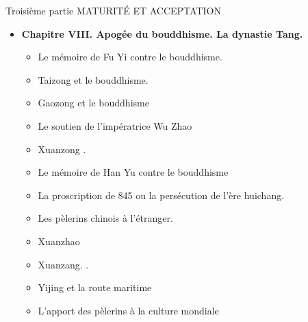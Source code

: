 Troisième partie
MATURITÉ ET ACCEPTATION
\begin{itemize}
    \item \textbf{Chapitre VIII. Apogée du bouddhisme. La dynastie Tang.}
    \begin{itemize}
        \item Le mémoire de Fu Yi contre le bouddhisme.
    \end{itemize}
    \begin{itemize}
        \item Taizong et le bouddhisme.
    \end{itemize}
    \begin{itemize}
        \item Gaozong et le bouddhisme
    \end{itemize}
    \begin{itemize}
        \item Le soutien de l'impératrice Wu Zhao
    \end{itemize}
    \begin{itemize}
        \item Xuanzong .
    \end{itemize}
    \begin{itemize}
        \item Le mémoire de Han Yu contre le bouddhisme
    \end{itemize}
    \begin{itemize}
        \item La proscription de 845 ou la persécution de l'ère huichang.
    \end{itemize}
    \begin{itemize}
        \item Les pèlerins chinois à l'étranger.
    \end{itemize}
    \begin{itemize}
        \item Xuanzhao
    \end{itemize}
    \begin{itemize}
        \item Xuanzang. .
    \end{itemize}
    \begin{itemize}
        \item Yijing et la route maritime
    \end{itemize}
    \begin{itemize}
        \item L'apport des pèlerins à la culture mondiale
    \end{itemize}

\end{itemize}
